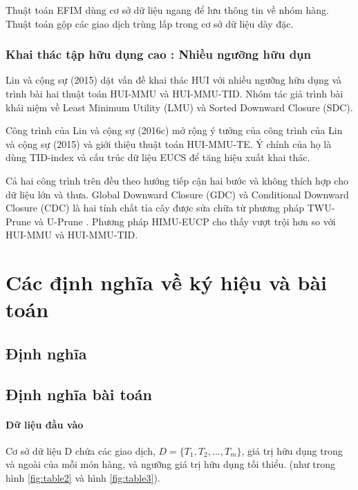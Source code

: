 Thuật toán EFIM \cite{zida2017efim} dùng cơ sở dữ liệu ngang để lưu thông tin về nhóm hàng. Thuật toán gộp các giao dịch trùng lấp trong cơ sở dữ liệu dày đặc. 

\subsubsection{Khai thác tập hữu dụng cao : Nhiều ngưỡng hữu dụn}

Lin và cộng sự (2015) \cite{lin2015mining} dặt vấn đề khai thác HUI với nhiều ngưỡng hữu dụng và trình bài hai thuật toán HUI-MMU và HUI-MMU-TID. Nhóm tác giả trình bài khái niệm về Least Minimum Utility (LMU) và Sorted Downward Closure (SDC). 

Công trình của Lin và cộng sự (2016c) \cite{lin2016efficient} mở rộng ý tưởng của công trình của Lin và cộng sự (2015) \cite{lin2015mining} và giới thiệu thuật toán HUI-MMU-TE. Ý chính của họ là dùng TID-index và cấu trúc dữ liệu EUCS \cite{fournier2014fhm} để tăng hiệu xuất khai thác. 

Cả hai công trình trên đều theo hướng tiếp cận hai bước và không thích hợp cho dữ liệu lớn và thưa. Global Downward Closure (GDC) và Conditional Downward Closure (CDC) \cite{gan2016more} là hai tính chất tỉa cây được sửa chữa từ phương pháp TWU-Prune \cite{liu2005two} và U-Prune \cite{liu2012mining}. Phương pháp HIMU-EUCP cho thấy vượt trội hơn so với HUI-MMU và HUI-MMU-TID. 



\section{Các định nghĩa về ký hiệu và bài toán}

\subsection{Định nghĩa}
 

\subsection{Định nghĩa bài toán}

\paragraph{Dữ liệu đầu vào} Cơ sở dữ liệu D chứa các giao dịch, $D = \{T_1, T_2, ..., T_m\}$, giá trị hữu dụng trong và ngoài của mỗi món hàng, và ngưỡng giá trị hữu dụng tối thiểu. (như trong hình \ref{fig:table2} và hình \ref{fig:table3}).

